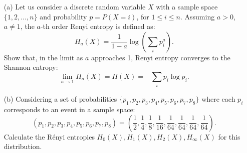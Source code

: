 \documentclass[12pt,openany]{book}
\theoremstyle{definition}
\begin{document}
\begin{itemize}
	\item[(a)] Let us consider a discrete random variable \(X\) with a sample space \(\{1, 2, \ldots, n\}\) and probability \(p = P(X=i)\), for \(1 \leq i \leq n\). Assuming \(a > 0\), \(a \neq 1\), the \(a\)-th order Renyi entropy is defined as:
	\[
	H_a(X) = \frac{1}{1-a} \log \left( \sum_{i} p_i^a \right).
	\]
	Show that, in the limit as \(a\) approaches 1, Renyi entropy converges to the Shannon entropy:
	\[
	\lim_{a \to 1} H_a(X) = H(X) = - \sum_{i} p_i \log p_i.
	\]
	
	\item[(b)] Considering a set of probabilities \(\{p_1, p_2, p_3, p_4, p_5, p_6, p_7, p_8\}\) where each \(p_i\) corresponds to an event in a sample space:
	\[
	(p_1, p_2, p_3, p_4, p_5, p_6, p_7, p_8) = \left( \frac{1}{2}, \frac{1}{4}, \frac{1}{8}, \frac{1}{16}, \frac{1}{64}, \frac{1}{64}, \frac{1}{64}, \frac{1}{64} \right).
	\]
	Calculate the R\'enyi entropies \(H_0(X), H_1(X), H_2(X), H_\infty(X)\) for this distribution.
\end{itemize}
\end{document}

